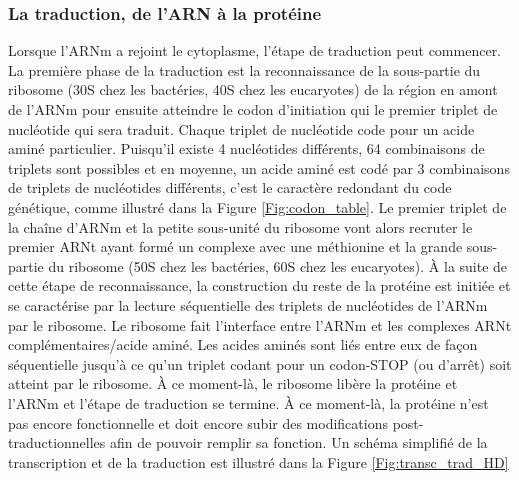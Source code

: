 \subsubsection{La traduction, de l'ARN à la protéine}



Lorsque l'ARNm a rejoint le cytoplasme, l'étape de traduction peut commencer. La première phase de la traduction est la reconnaissance de la sous-partie du ribosome (30S chez les bactéries, 40S chez les eucaryotes) de la région en amont de l'ARNm pour ensuite atteindre le codon d'initiation qui le premier triplet de nucléotide qui sera traduit. Chaque triplet de nucléotide code pour un acide aminé particulier. Puisqu'il existe 4 nucléotides différents, 64 combinaisons de triplets sont possibles et en moyenne, un acide aminé est codé par 3 combinaisons de triplets de nucléotides différents, c'est le caractère redondant du code génétique, comme illustré dans la Figure \ref{Fig:codon_table}. 
Le premier triplet de la chaîne d'ARNm et la petite sous-unité du ribosome vont alors recruter le premier ARNt ayant formé un complexe avec une méthionine et la grande sous-partie du ribosome (50S chez les bactéries, 60S chez les eucaryotes). À la suite de cette étape de reconnaissance, la construction du reste de la protéine est initiée et se caractérise par la lecture séquentielle des triplets de nucléotides de l'ARNm par le ribosome. Le ribosome fait l'interface entre l'ARNm et les complexes ARNt complémentaires/acide aminé. Les acides aminés sont liés entre eux de façon séquentielle jusqu'à ce qu'un triplet codant pour un codon-STOP (ou d'arrêt) soit atteint par le ribosome. À ce moment-là, le ribosome libère la protéine et l'ARNm et l'étape de traduction se termine. À ce moment-là, la protéine n'est pas encore fonctionnelle et doit encore subir des modifications post-traductionnelles afin de pouvoir remplir sa fonction. Un schéma simplifié de la transcription et de la traduction est illustré dans la Figure \ref{Fig:transc_trad_HD}

